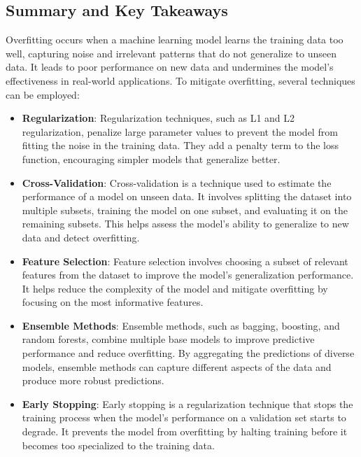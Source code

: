 \documentclass[12pt]{book} %
\begin{document}
\subsection{Summary and Key Takeaways}

Overfitting occurs when a machine learning model learns the training data too well, capturing noise and irrelevant patterns that do not generalize to unseen data. It leads to poor performance on new data and undermines the model's effectiveness in real-world applications. To mitigate overfitting, several techniques can be employed:

\begin{itemize}
    \item \textbf{Regularization}: Regularization techniques, such as L1 and L2 regularization, penalize large parameter values to prevent the model from fitting the noise in the training data. They add a penalty term to the loss function, encouraging simpler models that generalize better.
    
    \item \textbf{Cross-Validation}: Cross-validation is a technique used to estimate the performance of a model on unseen data. It involves splitting the dataset into multiple subsets, training the model on one subset, and evaluating it on the remaining subsets. This helps assess the model's ability to generalize to new data and detect overfitting.
    
    \item \textbf{Feature Selection}: Feature selection involves choosing a subset of relevant features from the dataset to improve the model's generalization performance. It helps reduce the complexity of the model and mitigate overfitting by focusing on the most informative features.
    
    \item \textbf{Ensemble Methods}: Ensemble methods, such as bagging, boosting, and random forests, combine multiple base models to improve predictive performance and reduce overfitting. By aggregating the predictions of diverse models, ensemble methods can capture different aspects of the data and produce more robust predictions.
    
    \item \textbf{Early Stopping}: Early stopping is a regularization technique that stops the training process when the model's performance on a validation set starts to degrade. It prevents the model from overfitting by halting training before it becomes too specialized to the training data.
\end{itemize}
\end{document}
